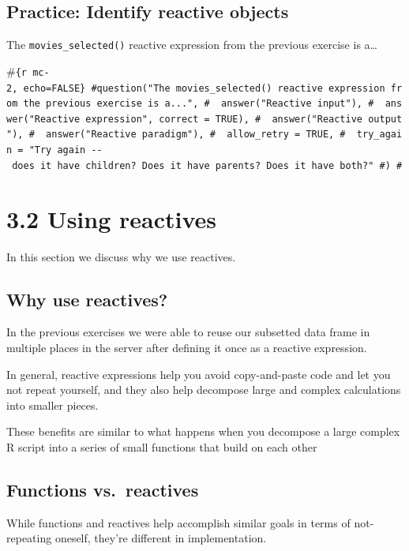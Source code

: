 \documentclass[
  letterpaper,
  DIV=11,
  numbers=noendperiod]{scrreprt}
\begin{document}
\hypertarget{practice-identify-reactive-objects}{%
\subsection{Practice: Identify reactive
objects}\label{practice-identify-reactive-objects}}

The \texttt{movies\_selected()} reactive expression from the previous
exercise is a\ldots{}

\#\texttt{\{r\ mc-2,\ echo=FALSE\}\ \#question("The\ \textasciigrave{}movies\_selected()\textasciigrave{}\ reactive\ expression\ from\ the\ previous\ exercise\ is\ a...",\ \#\ \ answer("Reactive\ input"),\ \#\ \ answer("Reactive\ expression",\ correct\ =\ TRUE),\ \#\ \ answer("Reactive\ output"),\ \#\ \ answer("Reactive\ paradigm"),\ \#\ \ allow\_retry\ =\ TRUE,\ \#\ \ try\_again\ =\ "Try\ again\ -\/-\ does\ it\ have\ children?\ Does\ it\ have\ parents?\ Does\ it\ have\ both?"\ \#)\ \#}

\hypertarget{using-reactives}{%
\section{3.2 Using reactives}\label{using-reactives}}

In this section we discuss why we use reactives.

\hypertarget{why-use-reactives}{%
\subsection{Why use reactives?}\label{why-use-reactives}}

In the previous exercises we were able to reuse our subsetted data frame
in multiple places in the server after defining it once as a reactive
expression.

In general, reactive expressions help you avoid copy-and-paste code and
let you not repeat yourself, and they also help decompose large and
complex calculations into smaller pieces.

These benefits are similar to what happens when you decompose a large
complex R script into a series of small functions that build on each
other

\hypertarget{functions-vs.-reactives}{%
\subsection{Functions vs.~reactives}\label{functions-vs.-reactives}}

While functions and reactives help accomplish similar goals in terms of
not-repeating oneself, they're different in implementation.
\end{document}
